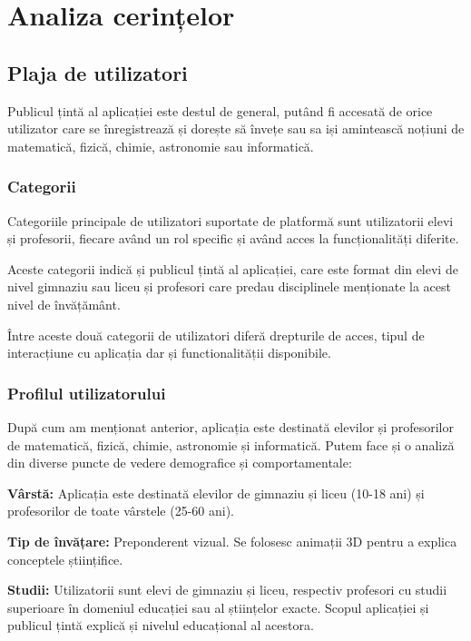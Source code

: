 \chapter{Analiza cerințelor}
\label{chapter:analiza}

\section{Plaja de utilizatori}
\label{sec:proj}

Publicul țintă al aplicației este destul de general, putând fi accesată de orice
utilizator care se înregistrează și dorește să învețe sau sa iși amintească noțiuni de matematică, fizică, chimie,
astronomie sau informatică.

\subsection{Categorii}
\label{sub-sec:proj-scope}

Categoriile principale de utilizatori suportate de platformă sunt utilizatorii elevi și profesorii, fiecare având
un rol specific și având acces la funcționalități diferite.

Aceste categorii indică și publicul țintă al aplicației, care este format din elevi de nivel gimnaziu sau liceu
și profesori care predau disciplinele menționate la acest nivel de învățământ.

Între aceste două categorii de utilizatori diferă drepturile de acces, tipul de interacțiune cu aplicația dar și
functionalității disponibile.

\subsection{Profilul utilizatorului}
\label{sub-sec:proj-user-profile}

După cum am menționat anterior, aplicația este destinată elevilor și profesorilor de matematică, fizică, chimie, astronomie și informatică.
Putem face și o analiză din diverse puncte de vedere demografice și comportamentale:


\textbf{Vârstă:} Aplicația este destinată elevilor de gimnaziu și liceu (10-18 ani) și profesorilor de toate vârstele (25-60 ani). 

\textbf{Tip de învățare:} Preponderent vizual. Se folosesc animații 3D pentru a explica conceptele științifice.

\textbf{Studii:} Utilizatorii sunt elevi de gimnaziu și liceu, respectiv profesori cu studii superioare în domeniul educației sau al științelor exacte. Scopul aplicației și publicul țintă explică și nivelul educațional al acestora.

